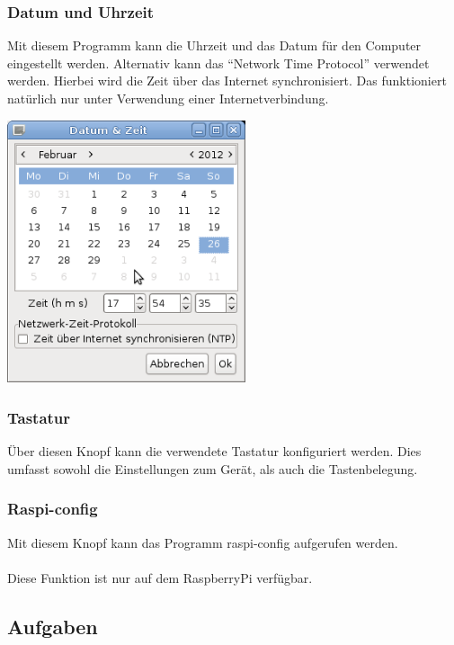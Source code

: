 \documentclass[a4paper,12pt,twoside]{article}
\begin{document}
\subsubsection{Datum und Uhrzeit}
\label{sct:datetime}
Mit diesem Programm kann die Uhrzeit und das Datum für den Computer
eingestellt werden. Alternativ kann das "`Network Time
Protocol"' verwendet werden. Hierbei wird die Zeit über
das Internet synchronisiert. Das funktioniert natürlich nur unter
Verwendung einer Internetverbindung.

\bigskip
\begin{minipage}{\linewidth}
    \centering
    \captionsetup{type=figure}
    \includegraphics[width=7cm]{screenshots/efaLivede-img25.png}
    \label{fig:datetime}
\end{minipage}
\bigskip

\subsubsection{Tastatur}
\label{sct:efalivesetup_keyboard}
Über diesen Knopf kann die verwendete Tastatur konfiguriert werden. Dies
umfasst sowohl die Einstellungen zum Gerät, als auch die
Tastenbelegung.


\subsubsection{Raspi-config}
\label{sct:efalivesetup_raspi_config}
Mit diesem Knopf kann das Programm raspi-config aufgerufen werden.\\
\\
Diese Funktion ist nur auf dem RaspberryPi verfügbar.


\subsection{Aufgaben}
\label{sct:efalivesetup_tasks}
\end{document}
